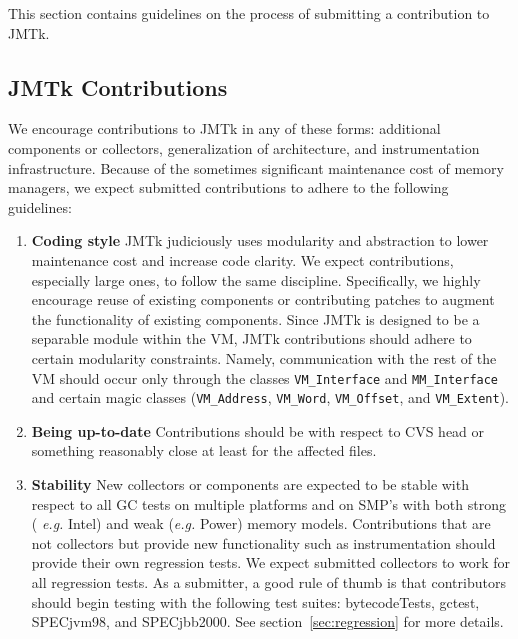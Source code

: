 This section contains guidelines on the process of
submitting a contribution to JMTk.


\subsection{JMTk Contributions}

We encourage contributions to JMTk in any of these forms: additional
components or collectors, generalization of architecture,
and instrumentation infrastructure.  Because of the sometimes significant
maintenance cost of memory managers, we expect submitted contributions
to adhere to the following guidelines:


\begin{enumerate}

\item {\bf Coding style}  
JMTk judiciously uses modularity and abstraction to lower maintenance
cost and increase code clarity.  We expect contributions, especially
large ones, to follow the same discipline.  Specifically, we highly
encourage reuse of existing components or contributing patches to
augment the functionality of existing components.  Since JMTk is
designed to be a separable module within the VM, JMTk contributions
should adhere to certain modularity constraints.  Namely,
communication with the rest of the VM should occur only through the
classes {\tt VM\_Interface} and {\tt MM\_Interface} and certain magic classes
({\tt VM\_Address}, {\tt VM\_Word}, {\tt VM\_Offset}, and {\tt VM\_Extent}).

\item {\bf Being up-to-date}  
Contributions should be with respect to CVS head or something
reasonably close at least for the affected files.

\item { \bf Stability}  
New collectors or components are expected to be stable with respect to
all GC tests on multiple platforms and on SMP's with both strong ({\it
e.g.} Intel\Rweb{}) and weak ({\it e.g.} Power) memory models.  Contributions
that are not collectors but provide new functionality such as
instrumentation should provide their own regression tests.
We expect submitted collectors to work for all regression tests.
As a submitter, a good rule of thumb is that contributors should begin
testing with the following test suites: bytecodeTests, gctest, 
SPECjvm\Rweb{}98, and SPECjbb\Rweb{}2000.  See section~\ref{sec:regression}
for more details.


\end{enumerate}
